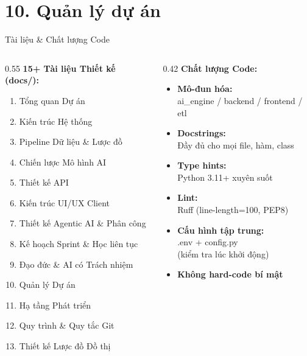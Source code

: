 \documentclass[aspectratio=169, 11pt]{beamer}
\begin{document}
\section{10. Quản lý dự án}

\begin{frame}{Tài liệu \& Chất lượng Code}
  \begin{columns}[t]
    \begin{column}{0.55\textwidth}
      \textbf{15+ Tài liệu Thiết kế (docs/):}
      \begin{enumerate}
        \scriptsize
        \item Tổng quan Dự án
        \item Kiến trúc Hệ thống
        \item Pipeline Dữ liệu \& Lược đồ
        \item Chiến lược Mô hình AI
        \item Thiết kế API
        \item Kiến trúc UI/UX Client
        \item Thiết kế Agentic AI \& Phân công
        \item Kế hoạch Sprint \& Học liên tục
        \item Đạo đức \& AI có Trách nhiệm
        \item Quản lý Dự án
        \item Hạ tầng Phát triển
        \item Quy trình \& Quy tắc Git
        \item Thiết kế Lược đồ Đồ thị
      \end{enumerate}
    \end{column}
    \begin{column}{0.42\textwidth}
      \textbf{Chất lượng Code:}
      \begin{itemize}
        \scriptsize
        \item \textbf{Mô-đun hóa:}\\
          ai\_engine / backend / frontend / etl
        \item \textbf{Docstrings:}\\
          Đầy đủ cho mọi file, hàm, class
        \item \textbf{Type hints:}\\
          Python 3.11+ xuyên suốt
        \item \textbf{Lint:}\\
          Ruff (line-length=100, PEP8)
        \item \textbf{Cấu hình tập trung:}\\
          .env + config.py\\
          (kiểm tra lúc khởi động)
        \item \textbf{Không hard-code bí mật}
      \end{itemize}
    \end{column}
  \end{columns}
\end{frame}
\end{document}
